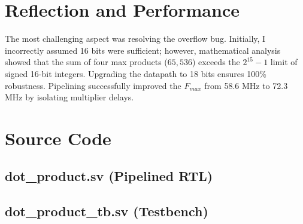 \documentclass[11pt,letterpaper]{article}
\begin{document}
\section{Reflection and Performance}
The most challenging aspect was resolving the overflow bug. Initially, I incorrectly assumed 16 bits were sufficient; however, mathematical analysis showed that the sum of four max products ($65,536$) exceeds the $2^{15}-1$ limit of signed 16-bit integers. Upgrading the datapath to 18 bits ensures 100\% robustness. Pipelining successfully improved the $F_{max}$ from 58.6 MHz to 72.3 MHz by isolating multiplier delays.

\newpage
\appendix
\section{Source Code}
\subsection{dot\_product.sv (Pipelined RTL)}

\pagebreak
\subsection{dot\_product\_tb.sv (Testbench)}

\end{document}
